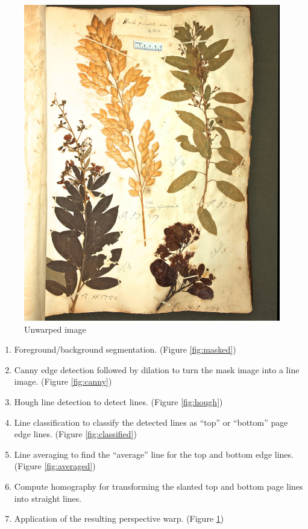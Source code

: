 \documentclass[runningheads,a4paper]{llncs}
\begin{document}
\begin{figure}[htbm]
  \includegraphics[width=\textwidth]{figures/Catesby_HS232_056_0602-unwarped-stretch.jpg}
  \caption{Unwarped image}\label{fig:unwarped}
\end{figure}

\begin{enumerate}
  \item Foreground/background segmentation. (Figure \ref{fig:masked})
  \item Canny edge detection followed by dilation to turn the mask image into a line image. (Figure \ref{fig:canny})
  \item Hough line detection to detect lines. (Figure \ref{fig:hough})
  \item Line classification to classify the detected lines as “top” or “bottom” page edge lines. (Figure \ref{fig:classified})
  \item Line averaging to find the “average” line for the top and bottom edge lines. (Figure \ref{fig:averaged})
  \item Compute homography for transforming the slanted top and bottom page lines into straight lines.
  \item Application of the resulting perspective warp. (Figure \ref{fig:unwarped})
\end{enumerate}
\end{document}
